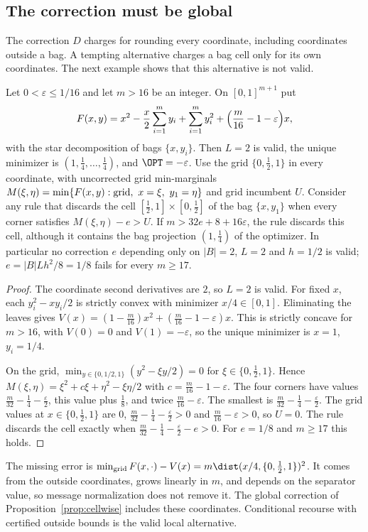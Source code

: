 \subsection{The correction must be global}\label{sec:limits-star}

The correction $D$ charges for rounding every coordinate, including
coordinates outside a bag. A tempting alternative charges a bag cell only for
its own coordinates. The next example shows that this alternative is not
valid.

\begin{proposition}\label{lim:prop:star}
Let $0<\varepsilon\le1/16$ and let $m>16$ be an integer. On $[0,1]^{m+1}$
put
\[
F(x,y)=x^2-\frac x2\sum_{i=1}^my_i+\sum_{i=1}^my_i^2
+\Bigl(\frac m{16}-1-\varepsilon\Bigr)x,
\]
with the star decomposition of bags $\{x,y_i\}$. Then $L=2$ is valid, the
unique minimizer is $(1,\tfrac14,\ldots,\tfrac14)$, and $\OPT=-\varepsilon$.
Use the grid $\{0,\tfrac12,1\}$ in every coordinate, with uncorrected grid
min-marginals
$M(\xi,\eta)=\min\{F(x,y):\hbox{grid},\ x=\xi,\ y_1=\eta\}$ and grid
incumbent $U$. Consider any rule that discards the cell
$[\tfrac12,1]\times[0,\tfrac12]$ of the bag $\{x,y_1\}$ when every corner
satisfies $M(\xi,\eta)-e>U$. If $m>32e+8+16\varepsilon$, the rule discards
this cell, although it contains the bag projection $(1,\tfrac14)$ of the
optimizer. In particular no correction $e$ depending only on $|B|=2$,
$L=2$ and $h=1/2$ is valid; $e=|B|Lh^2/8=1/8$ fails for every $m\ge17$.
\end{proposition}

\begin{proof}
The coordinate second derivatives are $2$, so $L=2$ is valid. For fixed $x$,
each $y_i^2-xy_i/2$ is strictly convex with minimizer $x/4\in[0,1]$.
Eliminating the leaves gives $V(x)=(1-\frac m{16})x^2+(\frac m{16}-1-
\varepsilon)x$. This is strictly concave for $m>16$, with $V(0)=0$ and
$V(1)=-\varepsilon$, so the unique minimizer is $x=1$, $y_i=1/4$.

On the grid, $\min_{y\in\{0,1/2,1\}}(y^2-\xi y/2)=0$ for $\xi\in\{0,\tfrac12,
1\}$. Hence $M(\xi,\eta)=\xi^2+c\xi+\eta^2-\xi\eta/2$ with
$c=\frac m{16}-1-\varepsilon$. The four corners have values
$\frac m{32}-\frac14-\frac\varepsilon2$, this value plus $\frac18$, and twice
$\frac m{16}-\varepsilon$. The smallest is
$\frac m{32}-\frac14-\frac\varepsilon2$. The grid values at
$x\in\{0,\tfrac12,1\}$ are $0$,
$\frac m{32}-\frac14-\frac\varepsilon2>0$ and $\frac m{16}-\varepsilon>0$,
so $U=0$. The rule discards the cell exactly when
$\frac m{32}-\frac14-\frac\varepsilon2-e>0$. For $e=1/8$ and $m\ge17$ this
holds.
\end{proof}

The missing error is $\min_{\rm grid}F(x,\cdot)-V(x)=m\dist(x/4,\{0,\tfrac12,
1\})^2$. It comes from the outside coordinates, grows linearly in $m$, and
depends on the separator value, so message normalization does not remove it.
The global correction of Proposition~\ref{prop:cellwise} includes these coordinates.
Conditional recourse with certified outside bounds is the valid local
alternative.


